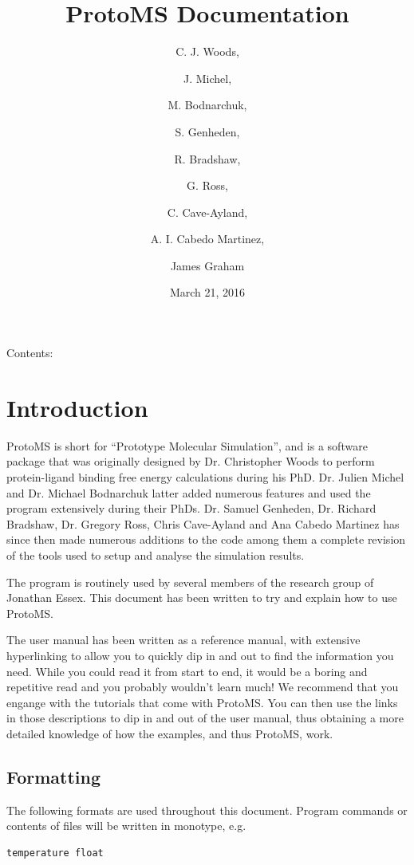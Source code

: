\documentclass[letterpaper,10pt,english]{sphinxmanual}
\title{ProtoMS Documentation}
\date{March 21, 2016}
\author{C. J. Woods, \and J. Michel, \and M. Bodnarchuk, \and S. Genheden, \and R. Bradshaw, \and G. Ross, \and C. Cave-Ayland, \and A. I. Cabedo Martinez, \and James Graham}
\begin{document}
\maketitle
\tableofcontents
{}\label{index::doc}


Contents:


\chapter{Introduction}
\label{introduction:introduction}\label{introduction:protoms-documentation}\label{introduction::doc}
ProtoMS is short for “Prototype Molecular Simulation”, and is a software package that was originally designed by Dr. Christopher Woods to perform protein-ligand binding free energy calculations during his PhD. Dr. Julien Michel and Dr. Michael Bodnarchuk latter added numerous features and used the program extensively during their PhDs. Dr. Samuel Genheden, Dr. Richard Bradshaw, Dr. Gregory Ross, Chris Cave-Ayland and Ana Cabedo Martinez has since then made numerous additions to the code among them a complete revision of the tools used to setup and analyse the simulation results.

The program is routinely used by several members of the research group of Jonathan Essex. This document has been written to try and explain how to use ProtoMS.

The user manual has been written as a reference manual, with extensive hyperlinking to allow you to quickly dip in and out to find the information you need. While you could read it from start to end, it would be a boring and repetitive read and you probably wouldn’t learn much! We recommend that you engange with the tutorials that come with ProtoMS. You can then use the links in those descriptions to dip in and out of the user manual, thus obtaining a more detailed knowledge of how the examples, and thus ProtoMS, work.


\section{Formatting}
\label{introduction:formatting}
The following formats are used throughout this document. Program commands or contents of files will be written in monotype, e.g.

\begin{Verbatim}[commandchars=\\\{\}]
temperature float
\end{Verbatim}
\end{document}
